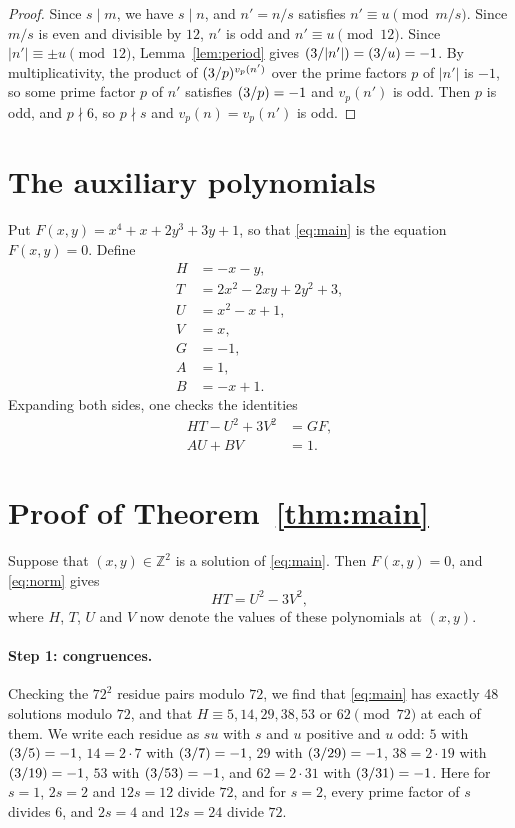 \documentclass[11pt]{article}
\newcommand{\Z}{\mathbb{Z}}
\newcommand{\leg}[2]{\mathchoice{\biggl(\dfrac{#1}{#2}\biggr)}{(#1/#2)}{(#1/#2)}{(#1/#2)}}
\begin{document}
\begin{proof}
Since $s\mid m$, we have $s\mid n$, and $n'=n/s$ satisfies $n'\equiv u\pmod{m/s}$. Since $m/s$ is even and divisible by $12$, $n'$ is odd and $n'\equiv u\pmod{12}$. Since $|n'|\equiv\pm u\pmod{12}$, Lemma~\ref{lem:period} gives $\leg{3}{|n'|}=\leg{3}{u}=-1$. By multiplicativity, the product of $\leg{3}{p}^{v_p(n')}$ over the prime factors $p$ of $|n'|$ is $-1$, so some prime factor $p$ of $n'$ satisfies $\leg{3}{p}=-1$ and $v_p(n')$ is odd. Then $p$ is odd, and $p\nmid6$, so $p\nmid s$ and $v_p(n)=v_p(n')$ is odd.
\end{proof}

\section{The auxiliary polynomials}

Put $F(x,y)=x^{4}+x+2y^{3}+3y+1$, so that \eqref{eq:main} is the equation $F(x,y)=0$. Define
\begin{align*}
H&=-x-y,\\
T&=2x^{2}-2xy+2y^{2}+3,\\
U&=x^{2}-x+1,\\
V&=x,\\
G&=-1,\\
A&=1,\\
B&=-x+1.
\end{align*}
Expanding both sides, one checks the identities
\begin{align}
HT-U^2+3V^2&=GF,\label{eq:norm}\\
AU+BV&=1.\label{eq:bezout}
\end{align}

\section{Proof of Theorem~\ref{thm:main}}

Suppose that $(x,y)\in\Z^2$ is a solution of \eqref{eq:main}. Then $F(x,y)=0$, and \eqref{eq:norm} gives
\begin{equation}\label{eq:HT}
HT=U^2-3V^2,
\end{equation}
where $H$, $T$, $U$ and $V$ now denote the values of these polynomials at $(x,y)$.

\paragraph{Step 1: congruences.} Checking the $72^2$ residue pairs modulo $72$, we find that \eqref{eq:main} has exactly 48 solutions modulo $72$, and that $H\equiv5,\allowbreak 14,\allowbreak 29,\allowbreak 38,\allowbreak 53\text{ or }62\pmod{72}$ at each of them. We write each residue as $su$ with $s$ and $u$ positive and $u$ odd: $5$ with $\leg{3}{5}=-1$, $14=2\cdot7$ with $\leg{3}{7}=-1$, $29$ with $\leg{3}{29}=-1$, $38=2\cdot19$ with $\leg{3}{19}=-1$, $53$ with $\leg{3}{53}=-1$, and $62=2\cdot31$ with $\leg{3}{31}=-1$. Here for $s=1$, $2s=2$ and $12s=12$ divide $72$, and for $s=2$, every prime factor of $s$ divides $6$, and $2s=4$ and $12s=24$ divide $72$.
\end{document}
